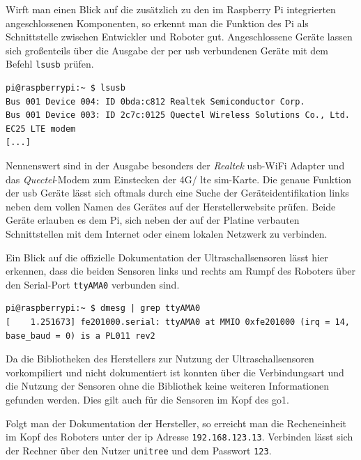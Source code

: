 Wirft man einen Blick auf die zusätzlich zu den im Raspberry Pi integrierten angeschlossenen Komponenten, so erkennt
man die Funktion des Pi als Schnittstelle zwischen Entwickler und Roboter gut.
Angeschlossene Geräte lassen sich großenteils über die Ausgabe der per \gls{usb} verbundenen Geräte mit dem Befehl
\texttt{lsusb} prüfen.

\begin{lstlisting}[label=lst:pi-usb]
pi@raspberrypi:~ $ lsusb
Bus 001 Device 004: ID 0bda:c812 Realtek Semiconductor Corp.
Bus 001 Device 003: ID 2c7c:0125 Quectel Wireless Solutions Co., Ltd. EC25 LTE modem
[...]
\end{lstlisting}

\noindent Nennenswert sind in der Ausgabe besonders der \emph{Realtek} \gls{usb}-WiFi Adapter und das \emph{Quectel}-Modem zum
Einstecken der 4G/ \gls{lte} \gls{sim}-Karte.
Die genaue Funktion der \gls{usb} Geräte lässt sich oftmals durch eine Suche der Geräteidentifikation links neben dem
vollen Namen des Gerätes auf der Herstellerwebsite prüfen.
Beide Geräte erlauben es dem Pi, sich neben der auf der Platine verbauten Schnittstellen mit dem Internet oder einem lokalen
Netzwerk zu verbinden.

Ein Blick auf die offizielle Dokumentation der Ultraschallsensoren lässt hier erkennen, dass die beiden Sensoren links und rechts
am Rumpf des Roboters über den Serial-Port \texttt{ttyAMA0} verbunden sind.

\begin{lstlisting}[label=lst:pi-ultrasonic]
pi@raspberrypi:~ $ dmesg | grep ttyAMA0
[    1.251673] fe201000.serial: ttyAMA0 at MMIO 0xfe201000 (irq = 14, base_baud = 0) is a PL011 rev2
\end{lstlisting}

\noindent Da die Bibliotheken des Herstellers zur Nutzung der Ultraschallsensoren vorkompiliert und nicht dokumentiert ist
konnten über die Verbindungsart und die Nutzung der Sensoren ohne die Bibliothek keine weiteren Informationen gefunden werden.
Dies gilt auch für die Sensoren im Kopf des \gls{go1}.

\label{par:nano-kopf}

Folgt man der Dokumentation der Hersteller, so erreicht man die Recheneinheit im Kopf des Roboters unter der \gls{ip} Adresse \texttt{192.168.123.13}.
Verbinden lässt sich der Rechner über den Nutzer \texttt{unitree} und dem Passwort \texttt{123}.

